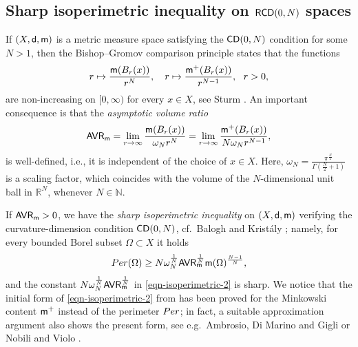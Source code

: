 \documentclass[11pt, reqno]{amsart}
\numberwithin{equation}{section}
\begin{document}
	\subsection{Sharp isoperimetric inequality on ${\sf RCD}(0,N)$ spaces} \label{subsection-2-3}	If $(X,{\sf d}, {\sf m})$ is a metric measure space satisfying the ${\sf CD}(0,N)$ condition for some $N>1$, then the Bishop--Gromov comparison principle states that the functions  
	\begin{equation}\label{Bishop-Gromov-monoton}
		r\mapsto \frac{ {\sf m}(B_r(x))}{r^{N}},\ \ \ r\mapsto \frac{ {\sf m}^+(B_r(x))}{r^{N-1}},\ \ r>0,
	\end{equation}
	are non-increasing on $[0,\infty)$ for every $x\in X$, see Sturm \cite{Sturm-2}.
	An important consequence is that the \textit{asymptotic volume ratio}
	\begin{equation}\label{AVR-difinition}
		{\sf AVR}_ {\sf m}=\lim_{r\to \infty}\frac{ {\sf m}(B_r(x))}{\omega_Nr^N}=\lim_{r\to \infty}\frac{ {\sf m}^+(B_r(x))}{N\omega_Nr^{N-1}},
	\end{equation}
	is well-defined, i.e., it is independent of the choice of $x\in X$. Here,  $\omega_N=\frac{\pi^{\frac{N}{2}}}{\Gamma(\frac{N}{2}+1)}$ is a scaling factor, which coincides with the volume of the $N$-dimensional unit ball in $\mathbb R^N$, whenever $N\in \mathbb N.$
	
	
	If ${\sf AVR}_ {\sf m}>0 $, we have the \textit{sharp isoperimetric inequality} on $(X,{\sf d}, {\sf m})$ verifying the curvature-dimension condition ${\sf CD}(0,N)$, cf.\ Balogh and Krist\'aly \cite{BK}; namely,  for  every bounded Borel subset $\Omega\subset X$ it holds  
	\begin{equation}\label{eqn-isoperimetric-2}
		{\rm Per}(\Omega)\geq N\omega_N^\frac{1}{N}{\sf AVR}_ {\sf m}^\frac{1}{N} {\sf m}(\Omega)^\frac{N-1}{N},
	\end{equation}
	and the constant $N\omega_N^\frac{1}{N}{\sf AVR}_ {\sf m}^\frac{1}{N}$ in  \eqref{eqn-isoperimetric-2} is sharp. 
	We notice that the initial form of \eqref{eqn-isoperimetric-2} from \cite{BK} has been proved for the Minkowski content ${\sf m}^+$ instead of the perimeter ${\rm Per}$; in fact,  a  suitable approximation argument also shows the present form, see e.g.\ Ambrosio, Di Marino and Gigli \cite[Theorem 3.6]{ADMG} or Nobili and Violo \cite[Proposition 3.10]{NV}.  
	
\end{document}
